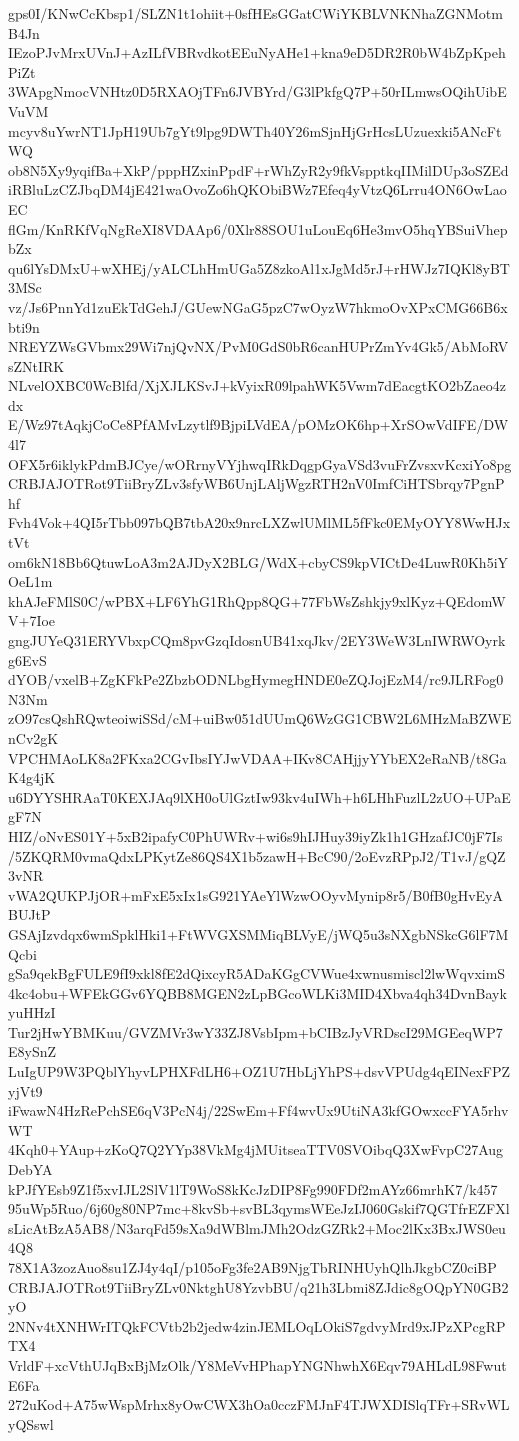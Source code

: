 gps0I/KNwCcKbsp1/SLZN1t1ohiit+0sfHEsGGatCWiYKBLVNKNhaZGNMotmB4Jn
IEzoPJvMrxUVnJ+AzILfVBRvdkotEEuNyAHe1+kna9eD5DR2R0bW4bZpKpehPiZt
3WApgNmocVNHtz0D5RXAOjTFn6JVBYrd/G3lPkfgQ7P+50rILmwsOQihUibEVuVM
mcyv8uYwrNT1JpH19Ub7gYt9lpg9DWTh40Y26mSjnHjGrHcsLUzuexki5ANcFtWQ
ob8N5Xy9yqifBa+XkP/pppHZxinPpdF+rWhZyR2y9fkVspptkqIIMilDUp3oSZEd
iRBluLzCZJbqDM4jE421waOvoZo6hQKObiBWz7Efeq4yVtzQ6Lrru4ON6OwLaoEC
flGm/KnRKfVqNgReXI8VDAAp6/0Xlr88SOU1uLouEq6He3mvO5hqYBSuiVhepbZx
qu6lYsDMxU+wXHEj/yALCLhHmUGa5Z8zkoAl1xJgMd5rJ+rHWJz7IQKl8yBT3MSc
vz/Js6PnnYd1zuEkTdGehJ/GUewNGaG5pzC7wOyzW7hkmoOvXPxCMG66B6xbti9n
NREYZWsGVbmx29Wi7njQvNX/PvM0GdS0bR6canHUPrZmYv4Gk5/AbMoRVsZNtIRK
NLvelOXBC0WcBlfd/XjXJLKSvJ+kVyixR09lpahWK5Vwm7dEacgtKO2bZaeo4zdx
E/Wz97tAqkjCoCe8PfAMvLzytlf9BjpiLVdEA/pOMzOK6hp+XrSOwVdIFE/DW4l7
OFX5r6iklykPdmBJCye/wORrnyVYjhwqIRkDqgpGyaVSd3vuFrZvsxvKcxiYo8pg
CRBJAJOTRot9TiiBryZLv3sfyWB6UnjLAljWgzRTH2nV0ImfCiHTSbrqy7PgnPhf
Fvh4Vok+4QI5rTbb097bQB7tbA20x9nrcLXZwlUMlML5fFkc0EMyOYY8WwHJxtVt
om6kN18Bb6QtuwLoA3m2AJDyX2BLG/WdX+cbyCS9kpVICtDe4LuwR0Kh5iYOeL1m
khAJeFMlS0C/wPBX+LF6YhG1RhQpp8QG+77FbWsZshkjy9xlKyz+QEdomWV+7Ioe
gngJUYeQ31ERYVbxpCQm8pvGzqIdosnUB41xqJkv/2EY3WeW3LnIWRWOyrkg6EvS
dYOB/vxelB+ZgKFkPe2ZbzbODNLbgHymegHNDE0eZQJojEzM4/rc9JLRFog0N3Nm
zO97csQshRQwteoiwiSSd/cM+uiBw051dUUmQ6WzGG1CBW2L6MHzMaBZWEnCv2gK
VPCHMAoLK8a2FKxa2CGvIbsIYJwVDAA+IKv8CAHjjyYYbEX2eRaNB/t8GaK4g4jK
u6DYYSHRAaT0KEXJAq9lXH0oUlGztIw93kv4uIWh+h6LHhFuzlL2zUO+UPaEgF7N
HIZ/oNvES01Y+5xB2ipafyC0PhUWRv+wi6s9hIJHuy39iyZk1h1GHzafJC0jF7Is
/5ZKQRM0vmaQdxLPKytZe86QS4X1b5zawH+BcC90/2oEvzRPpJ2/T1vJ/gQZ3vNR
vWA2QUKPJjOR+mFxE5xIx1sG921YAeYlWzwOOyvMynip8r5/B0fB0gHvEyABUJtP
GSAjIzvdqx6wmSpklHki1+FtWVGXSMMiqBLVyE/jWQ5u3sNXgbNSkcG6lF7MQcbi
gSa9qekBgFULE9fI9xkl8fE2dQixcyR5ADaKGgCVWue4xwnusmiscl2lwWqvximS
4kc4obu+WFEkGGv6YQBB8MGEN2zLpBGcoWLKi3MID4Xbva4qh34DvnBaykyuHHzI
Tur2jHwYBMKuu/GVZMVr3wY33ZJ8VsbIpm+bCIBzJyVRDscI29MGEeqWP7E8ySnZ
LuIgUP9W3PQblYhyvLPHXFdLH6+OZ1U7HbLjYhPS+dsvVPUdg4qEINexFPZyjVt9
iFwawN4HzRePchSE6qV3PcN4j/22SwEm+Ff4wvUx9UtiNA3kfGOwxccFYA5rhvWT
4Kqh0+YAup+zKoQ7Q2YYp38VkMg4jMUitseaTTV0SVOibqQ3XwFvpC27AugDebYA
kPJfYEsb9Z1f5xvIJL2SlV1lT9WoS8kKcJzDIP8Fg990FDf2mAYz66mrhK7/k457
95uWp5Ruo/6j60g80NP7mc+8kvSb+svBL3qymsWEeJzIJ060Gskif7QGTfrEZFXl
sLicAtBzA5AB8/N3arqFd59sXa9dWBlmJMh2OdzGZRk2+Moc2lKx3BxJWS0eu4Q8
78X1A3zozAuo8su1ZJ4y4qI/p105oFg3fe2AB9NjgTbRINHUyhQlhJkgbCZ0ciBP
CRBJAJOTRot9TiiBryZLv0NktghU8YzvbBU/q21h3Lbmi8ZJdic8gOQpYN0GB2yO
2NNv4tXNHWrITQkFCVtb2b2jedw4zinJEMLOqLOkiS7gdvyMrd9xJPzXPcgRPTX4
VrldF+xcVthUJqBxBjMzOlk/Y8MeVvHPhapYNGNhwhX6Eqv79AHLdL98FwutE6Fa
272uKod+A75wWspMrhx8yOwCWX3hOa0cczFMJnF4TJWXDISlqTFr+SRvWLyQSswl
